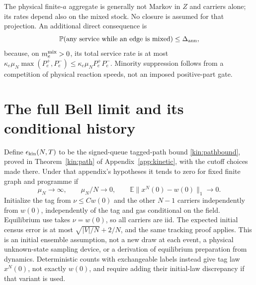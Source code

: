 \documentclass[11pt]{article}
\theoremstyle{definition}\newtheorem{definition}[theorem]{Definition}
\theoremstyle{remark}\newtheorem{remark}[theorem]{Remark}
\newcommand{\E}{\mathbb E}\newcommand{\Prb}{\mathbb P}
\begin{document}
The physical finite-$a$ aggregate is generally not Markov in $Z$ and carriers alone; its rates depend also on the mixed stock. No closure is assumed for that projection. An additional direct consequence is
\[
 \Prb(\text{any service while an edge is mixed})\le\Delta_{\rm ann},
\]
because, on $m_e^{\rm mix}>0$, its total service rate is at most $\kappa_e\mu_N\max(P_e^+,P_e^-)\le\kappa_e\mu_NP_e^+P_e^-$. Minority suppression follows from a competition of physical reaction speeds, not an imposed positive-part gate.

\section{The full Bell limit and its conditional history}\label{sec:mainlimit}
Define $\epsilon_{\rm kin}(N,T)$ to be the signed-queue tagged-path bound \eqref{kin:pathbound}, proved in Theorem~\ref{kin:path} of Appendix~\ref{app:kinetic}, with the cutoff choices made there. Under that appendix's hypotheses it tends to zero for fixed finite graph and programme if
\begin{equation}
 \mu_N\longrightarrow\infty,\qquad \mu_N/N\longrightarrow0,
 \qquad \E\|x^N(0)-w(0)\|_1\longrightarrow0.
 \label{eq:kineticscale}
\end{equation}
Initialize the tag from $\nu\le Cw(0)$ and the other $N-1$ carriers independently from $w(0)$, independently of the tag and gas conditional on the field. Equilibrium use takes $\nu=w(0)$, so all carriers are iid. The expected initial census error is at most $\sqrt{|V|/N}+2/N$, and the same tracking proof applies. This is an initial ensemble assumption, not a new draw at each event, a physical unknown-state sampling device, or a derivation of equilibrium preparation from dynamics. Deterministic counts with exchangeable labels instead give tag law $x^N(0)$, not exactly $w(0)$, and require adding their initial-law discrepancy if that variant is used.
\end{document}
